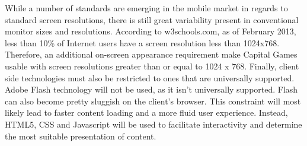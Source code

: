 While a number of standards are emerging in the mobile market in regards to standard screen resolutions, there is still great variability present in conventional monitor sizes and resolutions. According to w3schools.com, as of February 2013, less than 10\% of Internet users have a screen resolution less than 1024x768. Therefore, an additional on-screen appearance requirement make Capital Games usable with screen resolutions greater than or equal to 1024 x 768. Finally, client side technologies must also be restricted to ones that are universally supported. Adobe Flash technology will not be used, as it isn’t universally supported. Flash can also become pretty sluggish on the client’s browser. This constraint will most likely lead to faster content loading and a more fluid user experience. Instead, HTML5, CSS and Javascript will be used to facilitate interactivity and determine the most suitable presentation of content.